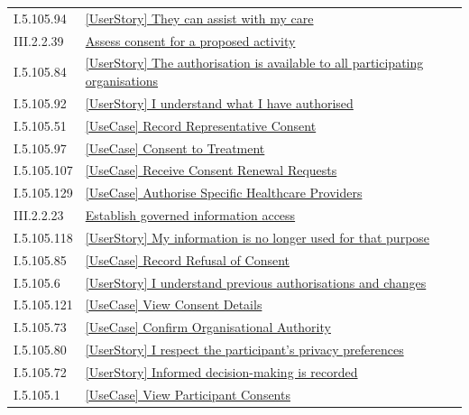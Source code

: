 \begin{longtable}{p{.22\linewidth}p{.73\linewidth}}
I.5.105.94 & \hyperref[element:17993cf2997e484c9d9daa3e30c81fb0]{[UserStory] They can assist with my care} \\
III.2.2.39 & \hyperref[element:17c66eb17d6040d09e250e787be71719]{Assess consent for a proposed activity} \\
I.5.105.84 & \hyperref[element:1adcef9ad7894ddb9f42e6f03626d615]{[UserStory] The authorisation is available to all participating organisations} \\
I.5.105.92 & \hyperref[element:1bc6ce5c6ab847ad8e7ecfa120317a5f]{[UserStory] I understand what I have authorised} \\
I.5.105.51 & \hyperref[element:1e4650edfd724a18b95901116a86583c]{[UseCase] Record Representative Consent} \\
I.5.105.97 & \hyperref[element:20c160092d6c4c41a3b86d71b27d024e]{[UseCase] Consent to Treatment} \\
I.5.105.107 & \hyperref[element:21fcc53b3c0f419db4a645ebf49a68ba]{[UseCase] Receive Consent Renewal Requests} \\
I.5.105.129 & \hyperref[element:22992b235caf47928a023cb76e2424b4]{[UseCase] Authorise Specific Healthcare Providers} \\
III.2.2.23 & \hyperref[element:26719186d6444b5b80029fbf13ae7d06]{Establish governed information access} \\
I.5.105.118 & \hyperref[element:27632c1ad82149aa96a6c76ce3687dfd]{[UserStory] My information is no longer used for that purpose} \\
I.5.105.85 & \hyperref[element:2925a855a18d44dcb8ef486ad22abace]{[UseCase] Record Refusal of Consent} \\
I.5.105.6 & \hyperref[element:29d5c982a25a456aa61e273d0dbaad89]{[UserStory] I understand previous authorisations and changes} \\
I.5.105.121 & \hyperref[element:325a42489a174a2ea5e06df102878f65]{[UseCase] View Consent Details} \\
I.5.105.73 & \hyperref[element:32fb86db4d3e4693976c302a56b43ce7]{[UseCase] Confirm Organisational Authority} \\
I.5.105.80 & \hyperref[element:3482898419404f5b8ed9be25f1aff6f5]{[UserStory] I respect the participant's privacy preferences} \\
I.5.105.72 & \hyperref[element:34c5615d7d6b4abe809977a289b59e8e]{[UserStory] Informed decision-making is recorded} \\
I.5.105.1 & \hyperref[element:3795d0880ace4d0d8288efc26d551340]{[UseCase] View Participant Consents} \\

\end{longtable}

